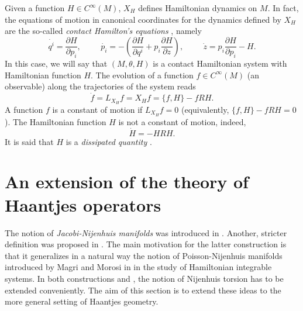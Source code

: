 \documentclass[10pt]{amsart}
\numberwithin{equation}{section}
\theoremstyle{definition}
\begin{document}
Given a function $H\in C^{\infty}(M)$, $X_{H}$ defines Hamiltonian dynamics on $M$. In fact, the equations of motion in canonical coordinates for the dynamics defined by $X_{H}$ are the so-called \textit{contact Hamilton's equations} \cite{LL2019,dLS2017,BCTAOP2017}, namely
\begin{equation}
\dot{q^{i}} =\frac{\partial H}{\partial p_{i}}, \hspace{1cm}
\dot{p_{i}} =-\left( \frac{\partial H}{\partial q^{i}}+p_{i}\frac{\partial H}{\partial z}\right) , \hspace{1cm}
\dot{z}=p_{i}\frac{\partial H}{\partial p_{i}}-H.
\end{equation}
In this case, we will say that $(M,\theta,H)$ is a contact Hamiltonian system with Hamiltonian function $H$. The evolution of a function $f\in C^{\infty}(M)$ (an observable) along the trajectories of the system reads
\begin{equation}
\dot{f}=L_{X_{H}}f=X_{H}f=\lbrace f,H\rbrace-fRH.
\end{equation}
A function $f$ is a constant of motion if $L_{X_{H}}f=0$ (equivalently, $\lbrace f,H\rbrace-fRH=0$). The Hamiltonian function $H$ is not a constant of motion, indeed,
\begin{equation}
\dot{H}=-HRH.
\end{equation}
It is said that $H$ is a \textit{dissipated quantity} \cite{BG2023,GGMRR2020,LL2020}.





\section{An extension of the theory of Haantjes operators}
\label{sec3}

The notion of \textit{Jacobi-Nijenhuis manifolds} was introduced in \cite{MMPCRAS1999}. Another, stricter definition was proposed in \cite{PNJGP2003}. The main motivation for the latter construction is that it generalizes in a natural way the notion of Poisson-Nijenhuis manifolds introduced by Magri and Morosi in \cite{MMQUAD1984} in the study of Hamiltonian integrable systems. In both constructions \cite{MMPCRAS1999} and \cite{PNJGP2003}, the notion of Nijenhuis torsion has to be extended conveniently.
The aim of this section is to extend these ideas to the more general setting of Haantjes geometry.
\end{document}

